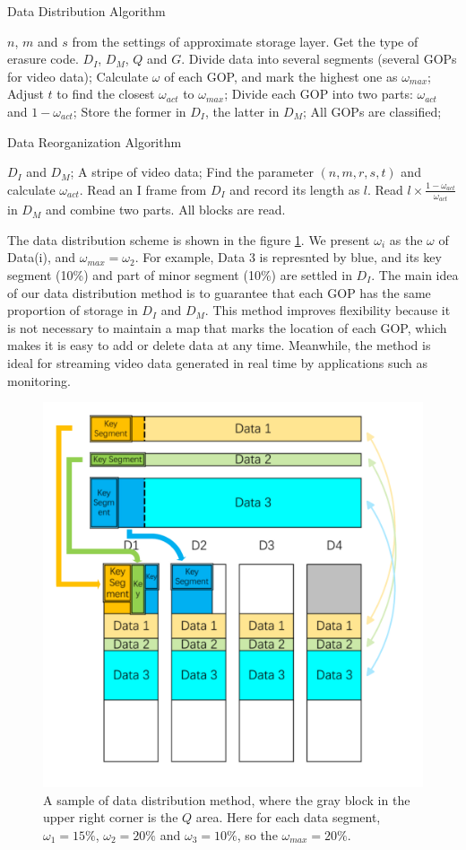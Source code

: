 \documentclass[sigconf]{acmart}
\begin{document}
\begin{algorithm}[htb] 
\caption{Data Distribution Algorithm} 
\label{alg-data-dist} 
\begin{algorithmic}[1] 

\Require  $n$, $m$ and $s$ from the settings of approximate storage layer. Get the type of erasure code.
\Ensure $D_I$, $D_M$, $Q$ and $G$.
\State Divide data into several segments (several GOPs for video data);
\State Calculate $\omega$ of each GOP, and mark the highest one as $\omega_{max}$;
\State Adjust $t$ to find the closest $\omega_{act}$ to $\omega_{max}$;
\Repeat 
\State Divide each GOP into two parts: $\omega_{act}$ and $1-\omega_{act}$;
\State Store the former in $D_I$, the latter in $D_M$;
\Until All GOPs are classified;
\EndWhile

\end{algorithmic} 
\end{algorithm}


\begin{algorithm}[htb] 
\caption{Data Reorganization Algorithm} 
\label{alg-data-reor} 
\begin{algorithmic}[1] 
\Require $D_I$ and $D_M$;
\Ensure A stripe of video data;
\State Find the parameter $(n,m,r,s,t)$ and calculate $\omega_{act}$.
\Repeat
\State Read an I frame from $D_I$ and record its length as $l$.
\State Read $l \times \frac{1-\omega_{act}}{\omega_{act}}$ in $D_M$ and combine two parts.
\Until All blocks are read.
\end{algorithmic} 
\end{algorithm}

The data distribution scheme is shown in the figure \ref{Data-distribution-v2}. We present $\omega_i$ as the $\omega$ of Data(i), and $\omega_{max} = \omega_2$.
For example, Data 3 is represnted by blue, and its key segment (10\%) and part of minor segment (10\%) are settled in $D_I$.
The main idea of our data distribution method is to guarantee that each GOP has the same proportion of storage in $D_I$ and $D_M$. This method improves flexibility because it is not necessary to maintain a map that marks the location of each GOP, which makes it is easy to add or delete data at any time. Meanwhile, the method is ideal for streaming video data generated in real time by applications such as monitoring.

\begin{figure}[htb]
\centering
\includegraphics[width=0.32 \textwidth]{photo/Data-distribution-v2.pdf}
\caption{A sample of data distribution method, where the gray block in the upper right corner is the $Q$ area. Here for each data segment, $\omega_1=15\%$, $\omega_2=20\%$ and $\omega_3=10\%$, so the $\omega_{max}=20\%$.}
\label{Data-distribution-v2}
\end{figure}
\end{document}
